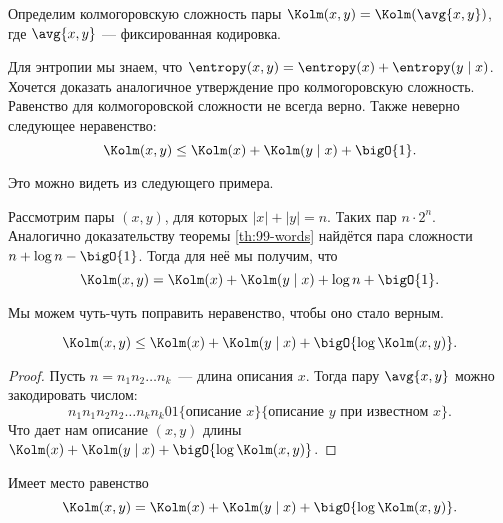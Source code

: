 \begin{definition}
    Определим колмогоровскую сложность пары $\Kolm(x, y) = \Kolm(\avg{x, y})$, где $\avg{x, y}$ ---
    фиксированная кодировка.
\end{definition}

Для энтропии мы знаем, что $\entropy(x, y) = \entropy(x) + \entropy(y \mid x)$. Хочется доказать
аналогичное утверждение про колмогоровскую сложность. Равенство для колмогоровской сложности не всегда
верно. Также неверно следующее неравенство:  
$$
    \Kolm(x, y) \le \Kolm(x) + \Kolm(y \mid x) + \bigO{1}.
$$
    
Это можно видеть из следующего примера.
\begin{example}
    Рассмотрим пары $(x, y)$, для которых $|x| + |y| = n$. Таких пар $n \cdot 2^n$. Аналогично
    доказательству теоремы \ref{th:99-words} найдётся пара сложности $n + \log n - \bigO{1}$. Тогда для
    неё мы получим, что  
    $$
        \Kolm(x, y) = \Kolm(x) + \Kolm(y \mid x) + \log n + \bigO{1}.
    $$
\end{example}

Мы можем чуть-чуть поправить неравенство, чтобы оно стало верным.
\begin{theorem}
    $$
        \Kolm(x, y) \le \Kolm(x) + \Kolm(y \mid x) + \bigO{\log \Kolm(x, y)}.
    $$
\end{theorem}

\begin{proof}
    Пусть $n = n_1n_2\ldots n_k$~--- длина описания $x$. Тогда пару $\avg{x, y}$ можно закодировать
    числом:
    $$
        n_1n_1n_2n_2 \ldots n_kn_k01\{\text{описание } x\}\{\text{описание } y \text{ при известном $x$}\}.
    $$
    Что дает нам описание $(x, y)$ длины $\Kolm(x) + \Kolm(y \mid x) + \bigO{\log \Kolm(x, y)}$.
\end{proof}

\begin{theorem}
    Имеет место равенство 
    $$
        \Kolm(x, y) = \Kolm(x) + \Kolm(y \mid x) + \bigO{\log \Kolm(x, y)}.
    $$
\end{theorem}

